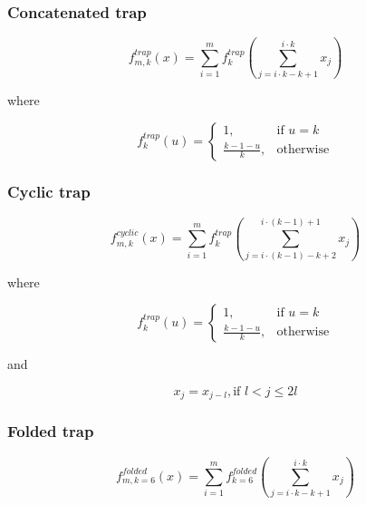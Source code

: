 \documentclass{sig-alternate-05-2015}
\begin{document}
\subsubsection{Concatenated trap}


\begin{displaymath}
f_{m,k}^{trap}(x) = \sum_{i=1}^{m} f_{k}^{trap} \left (\sum_{j = i\cdot k-k+1}^{i\cdot k} x_j\right )
\end{displaymath}

where

\begin{displaymath}
f_{k}^{trap}(u) = 
   \begin{cases}
    1, & \text{if $u=k$} \\
    \frac{k-1-u}{k}, & \text{otherwise}
	\end{cases}
\end{displaymath}




\subsubsection{Cyclic trap}


\begin{displaymath}
f_{m,k}^{cyclic}(x) = \sum_{i=1}^{m} f_{k}^{trap} \left (\sum_{j = i\cdot(k-1)-k+2}^{i\cdot(k-1)+1} x_j\right )
\end{displaymath}

where

\begin{displaymath}
f_{k}^{trap}(u) = 
   \begin{cases}
    1, & \text{if $u=k$} \\
    \frac{k-1-u}{k}, & \text{otherwise}
	\end{cases}
\end{displaymath}

and

\begin{displaymath}
x_j = x_{j-l}, \text{if } l < j \leq 2l
\end{displaymath}




\subsubsection{Folded trap}



\begin{displaymath}
f_{m,k=6}^{folded}(x) = \sum_{i=1}^{m} f_{k=6}^{folded} \left (\sum_{j = i\cdot k-k+1}^{i\cdot k} x_j\right )
\end{displaymath}
\end{document}
